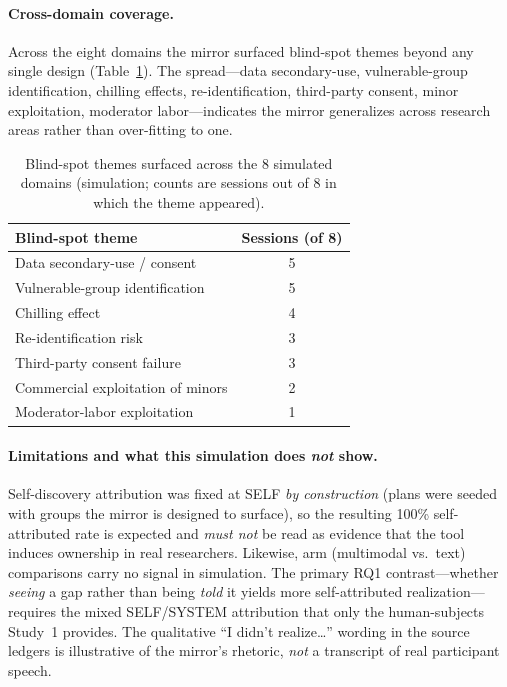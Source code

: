 \paragraph{Cross-domain coverage.}
Across the eight domains the mirror surfaced blind-spot themes beyond any
single design (Table~\ref{tab:simthemes}). The spread---data
secondary-use, vulnerable-group identification, chilling effects,
re-identification, third-party consent, minor exploitation, moderator
labor---indicates the mirror generalizes across research areas rather
than over-fitting to one.

\begin{table}[t]
  \centering
  \small
  \caption{Blind-spot themes surfaced across the 8 simulated domains
    (simulation; counts are sessions out of 8 in which the theme
    appeared).}
  \begin{tabular}{l c}
    \toprule
    Blind-spot theme                    & Sessions (of 8) \\
    \midrule
    Data secondary-use / consent       & 5 \\
    Vulnerable-group identification    & 5 \\
    Chilling effect                    & 4 \\
    Re-identification risk             & 3 \\
    Third-party consent failure        & 3 \\
    Commercial exploitation of minors  & 2 \\
    Moderator-labor exploitation       & 1 \\
    \bottomrule
  \end{tabular}
  \label{tab:simthemes}
\end{table}

\paragraph{Limitations and what this simulation does \emph{not} show.}
Self-discovery attribution was fixed at SELF \emph{by construction}
(plans were seeded with groups the mirror is designed to surface), so the
resulting 100\% self-attributed rate is expected and \emph{must not} be
read as evidence that the tool induces ownership in real researchers.
Likewise, arm (multimodal vs.\ text) comparisons carry no signal in
simulation. The primary RQ1 contrast---whether \emph{seeing} a gap rather
than being \emph{told} it yields more self-attributed realization---requires
the mixed SELF/SYSTEM attribution that only the human-subjects Study~1
provides. The qualitative ``I didn't realize\ldots'' wording in the source
ledgers is illustrative of the mirror's rhetoric, \emph{not} a transcript
of real participant speech.
